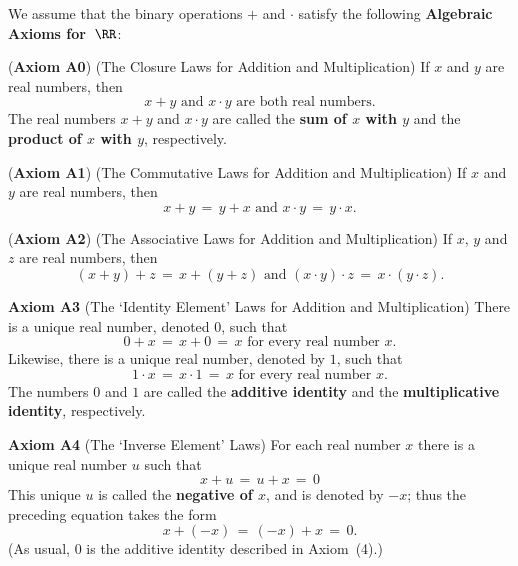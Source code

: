        We assume that the binary operations $+$ and ${\cdot}$ satisfy the following {\bf Algebraic Axioms for~${\RR}$}:

\V

        ({\bf Axiom A0}) (The Closure Laws for Addition and Multiplication) If $x$ and $y$ are real numbers, then
        \begin{displaymath}
        x+y \mbox{ and } x{\cdot}y \mbox{ are both real numbers}.
        \end{displaymath}
    The real numbers $x+y$ and $x{\cdot}y$ are called the {\bf sum of $x$ with $y$} and the {\bf product of $x$ with $y$}, respectively.

\V

        ({\bf Axiom A1}) (The Commutative Laws for Addition and Multiplication) If $x$ and $y$ are real numbers, then
        \begin{displaymath}
        x+y \,=\, y+x \mbox{ and } x{\cdot}y \,=\, y{\cdot}x.
        \end{displaymath}

\V

        ({\bf Axiom A2}) (The Associative Laws for Addition and Multiplication) If $x$, $y$ and $z$ are real numbers, then
        \begin{displaymath}
        (x+y)+z \,=\, x+(y+z) \mbox{ and } (x{\cdot}y){\cdot}z \,=\, x{\cdot}(y{\cdot}z).
        \end{displaymath}

\V

        {\bf Axiom A3} (The `Identity Element' Laws  for Addition and Multiplication) There is a unique real number, denoted $0$, such that
        \begin{displaymath}
        0+x \,=\, x+0 \,=\, x \mbox{ for every real number~$x$}.
        \end{displaymath}
    Likewise, there is a unique real number, denoted by $1$, such that
        \begin{displaymath}
        1{\cdot}x \,=\, x{\cdot}1 \,=\, x \mbox{ for every real number $x$}.
        \end{displaymath}
    The numbers $0$ and $1$ are called the {\bf additive identity} and the {\bf multiplicative identity}, respectively.

\V

        {\bf Axiom A4} (The `Inverse Element' Laws) For each real number $x$ there is a unique real number $u$ such that         
        \begin{displaymath}
        x + u \,=\, u + x \,=\, 0
        \end{displaymath}
    This unique $u$ is called the {\bf negative of $x$}, and is denoted by $-x$; thus the preceding equation takes the form
        \begin{displaymath}
        x+(-x) \,=\, (-x) + x \,=\, 0.
        \end{displaymath}
    (As usual, $0$ is the additive identity described in Axiom~(4).)

